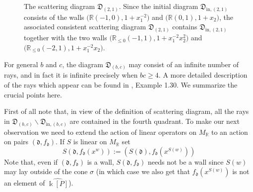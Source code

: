 \documentclass[11pt]{amsart}
\theoremstyle{remark}
\newtheorem{example}[theorem]{Example}
\numberwithin{equation}{section}
\newcommand{\RR}{\mathbb{R}}
\newcommand{\fd}{\mathfrak{d}}
\newcommand{\fD}{\mathfrak{D}}
\begin{document}

\begin{figure}
  \centering
  \caption{The scattering diagram $\fD_{(2,1)}$.  Since the initial diagram $\fD_{\mathrm{in},(2,1)}$ consists of the walls $\big(\RR(-1,0),\allowbreak 1+x_1^{-2}\big)$ and $\big(\RR (0,1), 1+x_2\big)$,
  the associated consistent scattering diagram $\fD_{(2,1)}$ contains $\fD_{\mathrm{in},(2,1)}$ together with
  the two walls $\big(\RR_{\leq 0} (-1,1), 1+x_1^{-2}x_2^2 \big)$ and $\big( \RR_{\leq 0} (-2,1), 1+x_1^{-2}x_2 \big)$.
} 
  \label{fig:diagex}
\end{figure}

For general $b$ and $c$, the diagram $\fD_{(b,c)}$ may consist of an infinite number of rays, and in fact
it is infinite precisely when $bc\ge 4$. A more detailed description of the rays
which appear can be found in \cite{GHKK}, Example 1.30. We summarize the crucial
points here.

First of all note that, in view of the definition of scattering diagram, all the
rays in  $\fD_{(b,c)} \smallsetminus \fD_{\mathrm{in},(b,c)}$ are contained in the
fourth quadrant.  To make our next observation we need to extend the action of
linear operators on $M_\RR$ to an action on pairs $(\fd,f_\fd)$. If $S$ is
linear on $M_\RR$ set
\begin{equation}
  \label{eqn:linear action}
  S(\fd,f_\fd(x^w))
  :=
  \left( S(\fd), f_\fd\left(x^{S(w)}\right) \right)
\end{equation}
Note that, even if $(\fd,f_\fd)$ is a wall, $S(\fd,f_\fd)$ needs not be a wall
since $S(w)$ may lay outside of the cone $\sigma$ (in which case we also get
that  $f_\fd\left(x^{S(w)}\right)$ is not an element of $\widehat{\Bbbk [P]}$).
\end{document}
